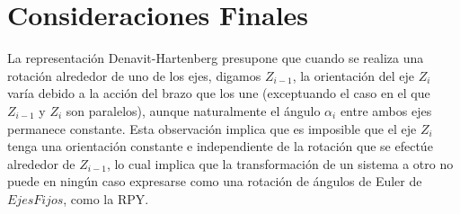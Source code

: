 \documentclass[11pt,a4paper,oldfontcommands,oneside]{memoir}
\begin{document}
\chapter{Consideraciones Finales}
La representación Denavit-Hartenberg presupone que cuando se realiza una rotación alrededor de uno de los ejes, digamos $Z_{i-1}$, la orientación del eje $Z_i$ varía debido a la acción del brazo que los une (exceptuando el caso en el que $Z_{i-1}$ y $Z_i$ son paralelos), aunque naturalmente el ángulo $\alpha_i$ entre ambos ejes permanece constante.
Esta observación implica que es imposible que el eje $Z_i$ tenga una orientación constante e independiente de la rotación que se efectúe alrededor de $Z_{i-1}$, lo cual implica que la transformación de un sistema a otro no puede en ningún caso expresarse como una rotación de ángulos de Euler de $Ejes Fijos$, como la RPY.

\vspace{2cm}
\hfill


\end{document}
